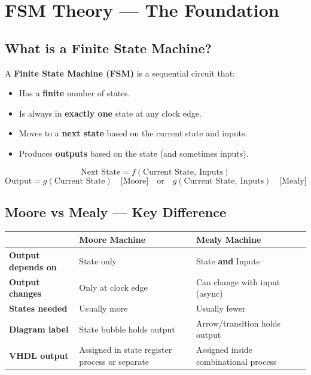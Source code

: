 \documentclass[12pt,a4paper]{article}
\begin{document}
\section{FSM Theory --- The Foundation}

\subsection{What is a Finite State Machine?}

A \textbf{Finite State Machine (FSM)} is a sequential circuit that:
\begin{itemize}[leftmargin=1.5cm]
  \item Has a \textbf{finite} number of states.
  \item Is always in \textbf{exactly one} state at any clock edge.
  \item Moves to a \textbf{next state} based on the current state and inputs.
  \item Produces \textbf{outputs} based on the state (and sometimes inputs).
\end{itemize}

\begin{tcolorbox}[notebox, title={Core Formula}]
  \[
    \text{Next State} = f(\text{Current State},\ \text{Inputs})
  \]
  \[
    \text{Output} = g(\text{Current State})
    \quad \text{[Moore]} \quad \text{or} \quad
    g(\text{Current State},\ \text{Inputs}) \quad \text{[Mealy]}
  \]
\end{tcolorbox}

\subsection{Moore vs Mealy --- Key Difference}

\begin{center}
\begin{tabular}{>{\bfseries}l  p{5.5cm}  p{5.5cm}}
  \toprule
  & \textbf{Moore Machine} & \textbf{Mealy Machine} \\
  \midrule
  Output depends on & State only & State \textbf{and} Inputs \\
  Output changes    & Only at clock edge & Can change with input (async) \\
  States needed     & Usually more & Usually fewer \\
  Diagram label     & State bubble holds output & Arrow/transition holds output \\
  VHDL output       & Assigned in state register process or separate & Assigned inside combinational process \\
  \bottomrule
\end{tabular}
\end{center}
\end{document}

